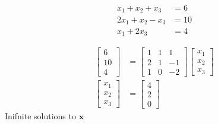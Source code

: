 \begin{align*}
    x_1 + x_2 + x_3 &= 6 \\
    2x_1 + x_2 - x_3 &= 10 \\
    x_1 + 2x_3 &= 4
\end{align*}

\begin{solution}
    \begin{align*}
        \begin{bmatrix}
            6 \\ 10 \\ 4
        \end{bmatrix} &= \begin{bmatrix}
            1 & 1 & 1 \\
            2 & 1 & -1 \\
            1 & 0 & -2
        \end{bmatrix}\begin{bmatrix}
            x_1 \\ x_2 \\ x_3
        \end{bmatrix} \\
        \begin{bmatrix}
            x_1 \\ x_2 \\ x_3
        \end{bmatrix} &= \begin{bmatrix}
            4 \\ 2 \\ 0
        \end{bmatrix}
    \end{align*}
    Inifnite solutions to $\boldsymbol{x}$
\end{solution}